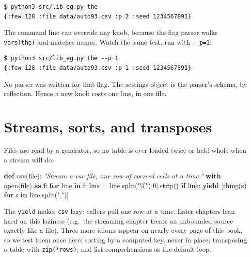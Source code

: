 \documentclass[
  justified]{tufte-book}
\newenvironment{Shaded}{}{}
\newcommand{\BuiltInTok}[1]{\textcolor[rgb]{0.00,0.50,0.00}{#1}}
\newcommand{\CommentTok}[1]{\textcolor[rgb]{0.38,0.63,0.69}{\textit{#1}}}
\newcommand{\ControlFlowTok}[1]{\textcolor[rgb]{0.00,0.44,0.13}{\textbf{#1}}}
\newcommand{\DecValTok}[1]{\textcolor[rgb]{0.25,0.63,0.44}{#1}}
\newcommand{\ImportTok}[1]{\textcolor[rgb]{0.00,0.50,0.00}{\textbf{#1}}}
\newcommand{\KeywordTok}[1]{\textcolor[rgb]{0.00,0.44,0.13}{\textbf{#1}}}
\newcommand{\NormalTok}[1]{#1}
\newcommand{\OperatorTok}[1]{\textcolor[rgb]{0.40,0.40,0.40}{#1}}
\newcommand{\StringTok}[1]{\textcolor[rgb]{0.25,0.44,0.63}{#1}}
\begin{document}
\begin{verbatim}
$ python3 src/lib_eg.py the
{:few 128 :file data/auto93.csv :p 2 :seed 1234567891}
\end{verbatim}

The command line can override any knob, because the flag parser walks
\texttt{vars(the)} and matches names. Watch the same test, run with
\texttt{-\/-p=1}:

\begin{verbatim}
$ python3 src/lib_eg.py the --p=1
{:few 128 :file data/auto93.csv :p 1 :seed 1234567891}
\end{verbatim}

No parser was written for that flag. The settings object is the parser's
schema, by reflection. Hence a new knob costs one line, in one file.

\section{Streams, sorts, and
transposes}\label{streams-sorts-and-transposes}

Files are read by a generator, so no table is ever loaded twice or held
whole when a stream will do:

\begin{Shaded}
\begin{Highlighting}[]
\KeywordTok{def}\NormalTok{ csv(}\BuiltInTok{file}\NormalTok{):}
  \CommentTok{"Stream a csv file, one row of coerced cells at a time."}
  \ControlFlowTok{with} \BuiltInTok{open}\NormalTok{(}\BuiltInTok{file}\NormalTok{) }\ImportTok{as}\NormalTok{ f:}
    \ControlFlowTok{for}\NormalTok{ line }\KeywordTok{in}\NormalTok{ f:}
\NormalTok{      line }\OperatorTok{=}\NormalTok{ line.split(}\StringTok{"\%"}\NormalTok{)[}\DecValTok{0}\NormalTok{].strip()}
      \ControlFlowTok{if}\NormalTok{ line:}
        \ControlFlowTok{yield}\NormalTok{ [thing(s) }\ControlFlowTok{for}\NormalTok{ s }\KeywordTok{in}\NormalTok{ line.split(}\StringTok{","}\NormalTok{)]}
\end{Highlighting}
\end{Shaded}

The \texttt{yield} makes \texttt{csv} lazy: callers pull one row at a
time. Later chapters lean hard on this laziness (e.g.~the streaming
chapter treats an unbounded source exactly like a file). Three more
idioms appear on nearly every page of this book, so we test them once
here: sorting by a computed key, never in place; transposing a table
with \texttt{zip(*rows)}; and list comprehensions as the default loop.
\end{document}
